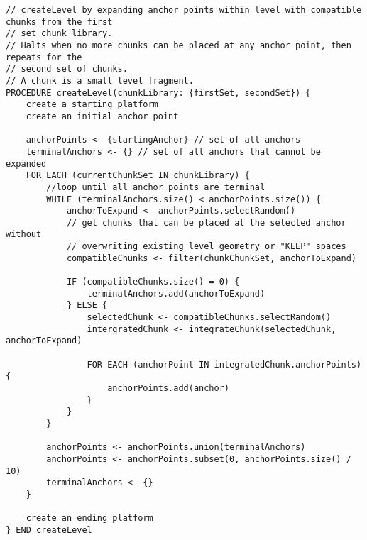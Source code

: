 
\hline
\begin{lstlisting}
// createLevel by expanding anchor points within level with compatible chunks from the first
// set chunk library.
// Halts when no more chunks can be placed at any anchor point, then repeats for the
// second set of chunks. 
// A chunk is a small level fragment.
PROCEDURE createLevel(chunkLibrary: {firstSet, secondSet}) {
    create a starting platform
    create an initial anchor point

    anchorPoints <- {startingAnchor} // set of all anchors
    terminalAnchors <- {} // set of all anchors that cannot be expanded
    FOR EACH (currentChunkSet IN chunkLibrary) {
        //loop until all anchor points are terminal
        WHILE (terminalAnchors.size() < anchorPoints.size()) {
            anchorToExpand <- anchorPoints.selectRandom()
            // get chunks that can be placed at the selected anchor without
            // overwriting existing level geometry or "KEEP" spaces
            compatibleChunks <- filter(chunkChunkSet, anchorToExpand)

            IF (compatibleChunks.size() = 0) {
                terminalAnchors.add(anchorToExpand)
            } ELSE {
                selectedChunk <- compatibleChunks.selectRandom()
                intergratedChunk <- integrateChunk(selectedChunk, anchorToExpand)

                FOR EACH (anchorPoint IN integratedChunk.anchorPoints) {
                    anchorPoints.add(anchor)
                }
            }
        }

        anchorPoints <- anchorPoints.union(terminalAnchors)
        anchorPoints <- anchorPoints.subset(0, anchorPoints.size() / 10)
        terminalAnchors <- {}
    }

    create an ending platform
} END createLevel
  
\end{lstlisting}
\hline